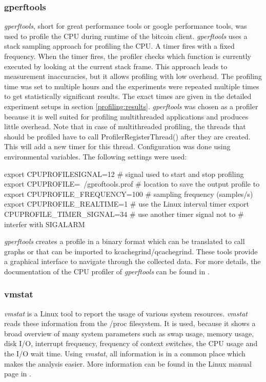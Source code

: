 \subsubsection{gperftools}
\textit{gperftools}, short for great performance tools or google performance tools, was used to profile the CPU during runtime of the bitcoin client. \textit{gperftools} uses a stack sampling approach for profiling the CPU. A timer fires with a fixed frequency. When the timer fires, the profiler checks which function is currently executed by looking at the current stack frame. This approach leads to measurement inaccuracies, but it allows profiling with low overhead. The profiling time was set to multiple hours and the experiments were repeated multiple times to get statistically significant results. The exact times are given in the detailed experiment setups in section \ref{profiling:results}. \textit{gperftools} was chosen as a profiler because it is well suited for profiling multithreaded applications and produces little overhead. Note that in case of multithreaded profiling, the threads that should be profiled have to call ProfilerRegisterThread() after they are created. This will add a new timer for this thread. Configuration was done using environmental variables. The following settings were used:
\begin{PseudoCode}
	export CPUPROFILESIGNAL=12 			# signal used to start and stop profiling
	export CPUPROFILE=~/gproftools.prof 		# location to save the output profile to
	export CPUPROFILE_FREQUENCY=100 		# sampling frequency (samples/s)
	export CPUPROFILE_REALTIME=1 			# use the Linux interval timer
	export CPUPROFILE_TIMER_SIGNAL=34 		# use another timer signal not to 
							# interfer with SIGALARM
\end{PseudoCode}
\textit{gperftools} creates a profile in a binary format which can be translated to call graphs or that can be imported to kcachegrind/qcachegrind\cite{cachegrind}. These tools provide a graphical interface to navigate through the collected data. For more details, the documentation of the CPU profiler of \textit{gperftools} can be found in \cite{gperftools}.

\subsubsection{vmstat}
\textit{vmstat} is a Linux tool to report the usage of various system resources. \textit{vmstat} reads these information from the /proc filesystem. It is used, because it shows a broad overview of many system parameters such as swap usage, memory usage, disk I/O, interrupt frequency, frequency of context switches, the CPU usage and the I/O wait time. Using \textit{vmstat}, all information is in a common place which makes the analysis easier. More information can be found in the Linux manual page in \cite{vmstat}.

